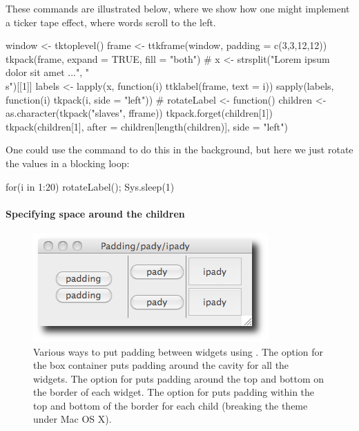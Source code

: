These commands are illustrated below, where we show how one might
implement a ticker tape effect, where words scroll to the left.
\begin{Schunk}
\begin{Sinput}
 window <- tktoplevel()
 frame <- ttkframe(window, padding = c(3,3,12,12))
 tkpack(frame, expand = TRUE, fill = "both")
 #
 x <- strsplit("Lorem ipsum dolor sit amet ...", "\\s")[[1]]
 labels <- lapply(x, function(i) ttklabel(frame, text = i))
 sapply(labels, function(i) tkpack(i, side = "left"))
 #
 rotateLabel <- function() {
   children <- as.character(tkpack("slaves", fframe))
   tkpack.forget(children[1])
   tkpack(children[1], after = children[length(children)], 
          side = "left")
 }
\end{Sinput}
\end{Schunk}

One could use the  command to do this in the background,
but here we just rotate the values in a blocking loop:
\begin{Schunk}
\begin{Sinput}
 for(i in 1:20) {rotateLabel(); Sys.sleep(1)}
\end{Sinput}
\end{Schunk}


\paragraph{Specifying space around the children}

\begin{figure}
  \centering
  \includegraphics[width=.6\textwidth]{fig-tcltk-padding-pady-ipady}
  \caption{Various ways to put padding between widgets using
    . The  option for the box container
    puts padding around the cavity for all the widgets. The
     option for  puts padding around the
    top and bottom on the border of each widget. The 
    option for  puts padding within the top and
    bottom of the border for each child (breaking the theme under Mac
    OS X).}
  \label{fig:fig-pack-example}
\end{figure}


